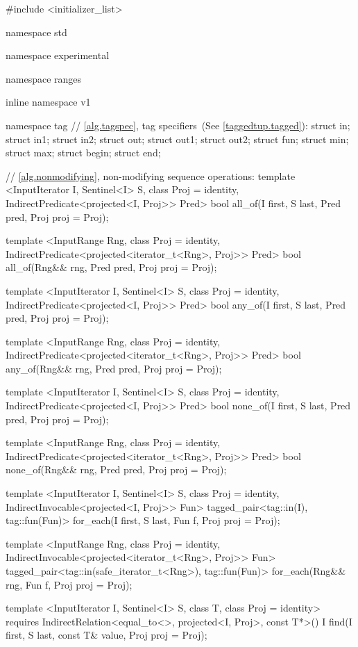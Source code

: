 \begin{codeblock}
#include <initializer_list>

namespace std { namespace experimental { namespace ranges { inline namespace v1 {
  namespace tag {
    // \ref{alg.tagspec}, tag specifiers~(See \ref{taggedtup.tagged}):
    struct in;
    struct in1;
    struct in2;
    struct out;
    struct out1;
    struct out2;
    struct fun;
    struct min;
    struct max;
    struct begin;
    struct end;
  }

  // \ref{alg.nonmodifying}, non-modifying sequence operations:
  template <InputIterator I, Sentinel<I> S, class Proj = identity,
      IndirectPredicate<projected<I, Proj>> Pred>
    bool all_of(I first, S last, Pred pred, Proj proj = Proj{});

  template <InputRange Rng, class Proj = identity,
      IndirectPredicate<projected<iterator_t<Rng>, Proj>> Pred>
    bool all_of(Rng&& rng, Pred pred, Proj proj = Proj{});

  template <InputIterator I, Sentinel<I> S, class Proj = identity,
      IndirectPredicate<projected<I, Proj>> Pred>
    bool any_of(I first, S last, Pred pred, Proj proj = Proj{});

  template <InputRange Rng, class Proj = identity,
      IndirectPredicate<projected<iterator_t<Rng>, Proj>> Pred>
    bool any_of(Rng&& rng, Pred pred, Proj proj = Proj{});

  template <InputIterator I, Sentinel<I> S, class Proj = identity,
      IndirectPredicate<projected<I, Proj>> Pred>
    bool none_of(I first, S last, Pred pred, Proj proj = Proj{});

  template <InputRange Rng, class Proj = identity,
      IndirectPredicate<projected<iterator_t<Rng>, Proj>> Pred>
    bool none_of(Rng&& rng, Pred pred, Proj proj = Proj{});

  template <InputIterator I, Sentinel<I> S, class Proj = identity,
      IndirectInvocable<projected<I, Proj>> Fun>
    tagged_pair<tag::in(I), tag::fun(Fun)>
      for_each(I first, S last, Fun f, Proj proj = Proj{});

  template <InputRange Rng, class Proj = identity,
      IndirectInvocable<projected<iterator_t<Rng>, Proj>> Fun>
    tagged_pair<tag::in(safe_iterator_t<Rng>), tag::fun(Fun)>
      for_each(Rng&& rng, Fun f, Proj proj = Proj{});

  template <InputIterator I, Sentinel<I> S, class T, class Proj = identity>
    requires IndirectRelation<equal_to<>, projected<I, Proj>, const T*>()
    I find(I first, S last, const T& value, Proj proj = Proj{});

}}}}
\end{codeblock}
